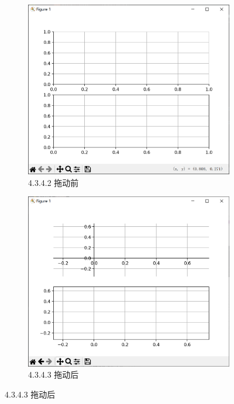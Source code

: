 \documentclass[12pt]{article}
\begin{document}
\begin{figure}[H]
    \centering
    \begin{subfigure}[b]{0.45\textwidth}
        \includegraphics[width=\textwidth]{脊柱设置 Pic1.png} %
        \caption{4.3.4.2 拖动前}
        \label{fig:line-graph2}
    \end{subfigure}
    \hfill
    \begin{subfigure}[b]{0.45\textwidth}
        \includegraphics[width=\textwidth]{脊柱设置 Pic2.png} %
        \caption{4.3.4.3 拖动后}
        \label{fig:line-graph2-pic2}
    \end{subfigure}
\end{figure}
\end{document}

